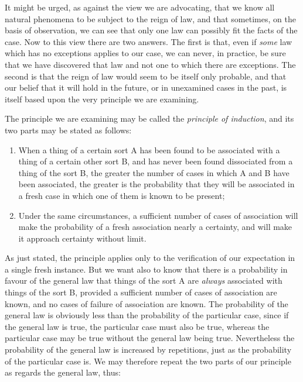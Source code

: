 \documentclass[oneside,letterpaper,12pt]{book}
\begin{document}
It might be urged, as against the view we are advocating, that we know
all natural phenomena to be subject to the reign of law, and that
sometimes, on the basis of observation, we can see that only one law can
possibly fit the facts of the case. Now to this view there are two
answers. The first is that, even if \emph{some} law which has no
exceptions applies to our case, we can never, in practice, be sure that
we have discovered that law and not one to which there are exceptions.
The second is that the reign of law would seem to be itself only
probable, and that our belief that it will hold in the future, or in
unexamined cases in the past, is itself based upon the very principle we
are examining.

The principle we are examining may be called the \emph{principle of
induction}, and its two parts may be stated as follows:

\begin{enumerate}[label={(\emph{\alph*})}]
	\item When a thing of a certain sort A has been found to be associated
	with a thing of a certain other sort B, and has never been found
	dissociated from a thing of the sort B, the greater the number of cases
	in which A and B have been associated, the greater is the probability
	that they will be associated in a fresh case in which one of them is
	known to be present;
	\item Under the same circumstances, a sufficient number of cases of
	association will make the probability of a fresh association nearly a
	certainty, and will make it approach certainty without limit.
\end{enumerate}
As just stated, the principle applies only to the verification of our
expectation in a single fresh instance. But we want also to know that
there is a probability in favour of the general law that things of the
sort A are \emph{always} associated with things of the sort B, provided
a sufficient number of cases of association are known, and no cases of
failure of association are known. The probability of the general law is
obviously less than the probability of the particular case, since if the
general law is true, the particular case must also be true, whereas the
particular case may be true without the general law being true.
Nevertheless the probability of the general law is increased by
repetitions, just as the probability of the particular case is. We may
therefore repeat the two parts of our principle as regards the general
law, thus:
\end{document}
